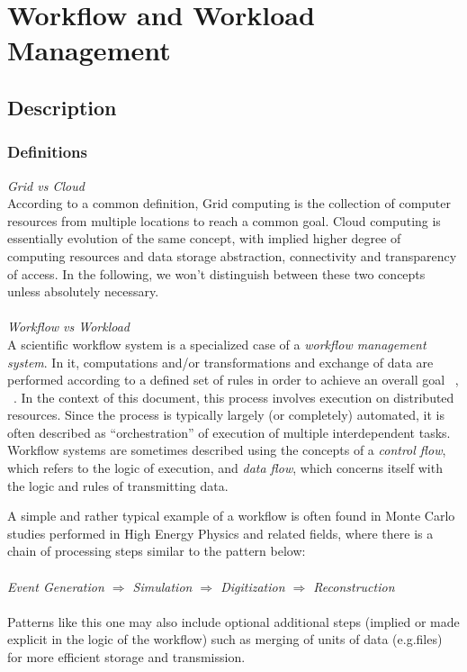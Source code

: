 \section{Workflow and Workload Management}



\subsection{Description}
\subsubsection{Definitions}

\textit{Grid vs Cloud}
\\
According to a common definition, Grid computing is the collection of computer resources from multiple locations to reach a common goal. Cloud computing is essentially evolution of the same concept, with implied higher degree of computing resources and data storage abstraction, connectivity and transparency of access. In the following, we won't distinguish between these two concepts unless absolutely necessary.
\\
\\
\textit{Workflow vs Workload}
\\
A scientific workflow system is a specialized case of a \textit{workflow management system}. In it, computations and/or transformations and exchange of data are performed according to a defined set of rules in order to achieve an overall goal ~\cite{grid_workflow_taxonomy}, ~\cite{grid_workflow_fit}. In the context of this document, this process involves execution on distributed resources. Since the process is typically largely (or completely) automated, it is often described as ``orchestration'' of execution of multiple interdependent tasks. Workflow systems are sometimes described using the concepts of a \textit{control flow}, which refers to the logic of execution, and \textit{data flow}, which concerns itself with the logic and rules of transmitting data.

A simple and rather typical example of a workflow is often found in Monte Carlo studies performed in High Energy Physics and related fields, where there is a chain of processing steps similar to the pattern below:
\\
\\
\textit{Event  Generation $\Longrightarrow$ Simulation $\Longrightarrow$ Digitization $\Longrightarrow$ Reconstruction}
\\
\\
Patterns like this one may also include optional additional steps (implied or made explicit in the logic of the workflow) such as merging of units of data (e.g.files) for more efficient storage and transmission.

